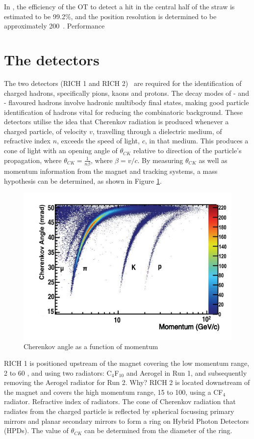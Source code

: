 In \runone, the efficiency of the OT to detect a hit in the central half of the straw is estimated to be 99.2\%, and the position resolution is determined to be approximately 200\mum~\cite{LHCb-DP-2013-003}. 
Performance~\cite{LHCb-DP-2013-002, LHCb-DP-2013-003}

	
\section{The \rich detectors}

The two \rich detectors (RICH 1 and RICH 2)~\cite{LHCb-DP-2012-003} are required for the identification of charged hadrons, specifically pions, kaons and protons. The decay modes of \bquark- and \cquark- flavoured hadrons involve hadronic multibody final states, making good particle identification of hadrons vital for reducing the combinatoric background. These detectors utilise the idea that Cherenkov radiation is produced whenever a charged particle, of velocity $v$, travelling through a dielectric medium, of refractive index $n$, exceeds the speed of light, $c$, in that medium. This produces a cone of light with an opening angle of $\theta_{CK}$ relative to direction of the particle's propagation, where $\theta_{CK} = \frac{1}{n\beta}$, where $\beta = v/c$. By measuring $\theta_{CK}$ as well as momentum information from the magnet and tracking systems, a mass hypothesis can be determined, as shown in Figure \ref{richseparation}.

\begin{figure}
\centering
\includegraphics[width=0.8\linewidth]{figures/detector/richseparation.pdf}
\caption{Cherenkov angle as a function of momentum}
\label{richseparation}
\end{figure}

RICH 1 is positioned upstream of the magnet covering the low momentum range, 2 to 60 \gevc, and using two radiators: C$_4$F$_{10}$ and Aerogel in Run 1, and subsequently removing the Aerogel radiator for Run 2. Why? RICH 2 is located downstream of the magnet and covers the high momentum range, 15 to 100\gevc, using a CF$_4$ radiator. Refractive index of radiators. The cone of Cherenkov radiation that radiates from the charged particle is reflected by spherical focussing primary mirrors and planar secondary mirrors to form a ring on Hybrid Photon Detectors (HPDs). The value of $\theta_{CK}$ can be determined from the diameter of the ring. 

